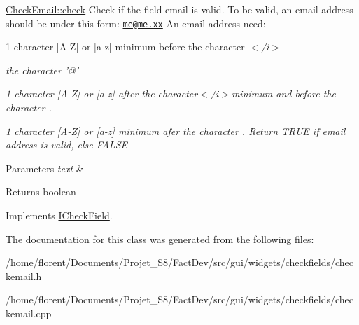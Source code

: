 \hyperlink{classCheckEmail_a544d7656d36bd463391fe2f4dd3e13c6}{Check\-Email\-::check} Check if the field email is valid. To be valid, an email address should be under this form\-: \href{mailto:me@me.xx}{\tt me@me.\-xx} An email address need\-: 


\begin{DoxyItemize}
\item 1 character \mbox{[}A-\/\-Z\mbox{]} or \mbox{[}a-\/z\mbox{]} minimum before the character {\itshape $<$/i$>$}
\item {\itshape the character '@'}
\item {\itshape 1 character \mbox{[}A-\/\-Z\mbox{]} or \mbox{[}a-\/z\mbox{]} after the character{\itshape $<$/i$>$minimum and before the character {\itshape .}}}
\item {\itshape {\itshape 1 character \mbox{[}A-\/\-Z\mbox{]} or \mbox{[}a-\/z\mbox{]} minimum afer the character {\itshape .} Return T\-R\-U\-E if email address is valid, else F\-A\-L\-S\-E 
\begin{DoxyParams}{Parameters}
{\em text} & \\
\hline
\end{DoxyParams}
\begin{DoxyReturn}{Returns}
boolean 
\end{DoxyReturn}
}}
\end{DoxyItemize}

Implements \hyperlink{classICheckField_a6bd42b4d49c165cdd92822135123fd4b}{I\-Check\-Field}.



The documentation for this class was generated from the following files\-:\begin{DoxyCompactItemize}
\item 
/home/florent/\-Documents/\-Projet\-\_\-\-S8/\-Fact\-Dev/src/gui/widgets/checkfields/checkemail.\-h\item 
/home/florent/\-Documents/\-Projet\-\_\-\-S8/\-Fact\-Dev/src/gui/widgets/checkfields/checkemail.\-cpp\end{DoxyCompactItemize}
